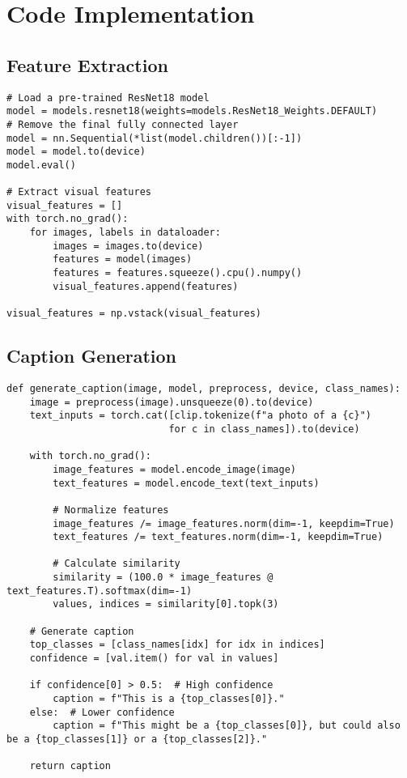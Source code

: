 \documentclass[12pt]{article}
\begin{document}
\appendix
\section{Code Implementation}
\subsection{Feature Extraction}
\begin{lstlisting}
# Load a pre-trained ResNet18 model
model = models.resnet18(weights=models.ResNet18_Weights.DEFAULT)
# Remove the final fully connected layer
model = nn.Sequential(*list(model.children())[:-1])
model = model.to(device)
model.eval()

# Extract visual features
visual_features = []
with torch.no_grad():
    for images, labels in dataloader:
        images = images.to(device)
        features = model(images)
        features = features.squeeze().cpu().numpy()
        visual_features.append(features)

visual_features = np.vstack(visual_features)
\end{lstlisting}

\subsection{Caption Generation}
\begin{lstlisting}
def generate_caption(image, model, preprocess, device, class_names):
    image = preprocess(image).unsqueeze(0).to(device)
    text_inputs = torch.cat([clip.tokenize(f"a photo of a {c}") 
                            for c in class_names]).to(device)
    
    with torch.no_grad():
        image_features = model.encode_image(image)
        text_features = model.encode_text(text_inputs)
        
        # Normalize features
        image_features /= image_features.norm(dim=-1, keepdim=True)
        text_features /= text_features.norm(dim=-1, keepdim=True)
        
        # Calculate similarity
        similarity = (100.0 * image_features @ text_features.T).softmax(dim=-1)
        values, indices = similarity[0].topk(3)
    
    # Generate caption
    top_classes = [class_names[idx] for idx in indices]
    confidence = [val.item() for val in values]
    
    if confidence[0] > 0.5:  # High confidence
        caption = f"This is a {top_classes[0]}."
    else:  # Lower confidence
        caption = f"This might be a {top_classes[0]}, but could also be a {top_classes[1]} or a {top_classes[2]}."
    
    return caption
\end{lstlisting}
\end{document}
